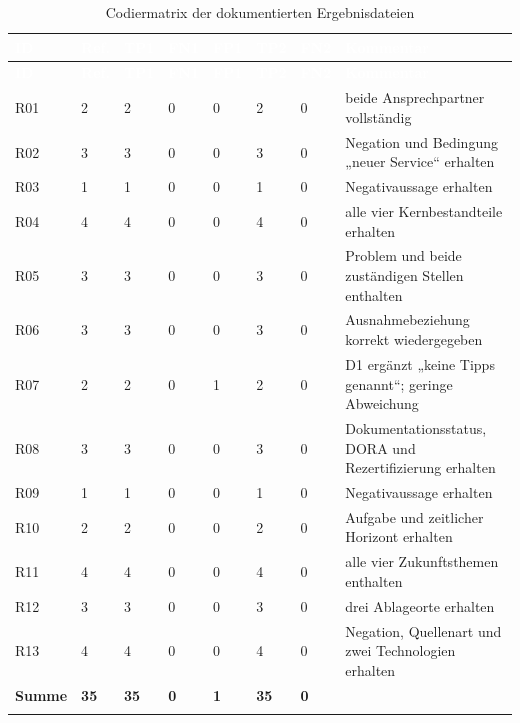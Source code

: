 \documentclass[
  10pt,
  ngerman,
  a4paper,
  toc=graduated,
  numbers=noenddot,
  headings=standardclasses
]{scrartcl}
\begin{document}
\scriptsize
\begin{longtable}{L{0.8cm}C{1.0cm}C{1.0cm}C{1.0cm}C{1.0cm}C{1.0cm}C{1.0cm}L{7.2cm}}
\toprule
{}
\textcolor{white}{\textbf{ID}} &
\textcolor{white}{\textbf{Ref.}} &
\textcolor{white}{\textbf{TP1}} &
\textcolor{white}{\textbf{FN1}} &
\textcolor{white}{\textbf{FP1}} &
\textcolor{white}{\textbf{TP2}} &
\textcolor{white}{\textbf{FN2}} &
\textcolor{white}{\textbf{Kommentar}}\\
\midrule
\endfirsthead
\toprule
{}
\textcolor{white}{\textbf{ID}} &
\textcolor{white}{\textbf{Ref.}} &
\textcolor{white}{\textbf{TP1}} &
\textcolor{white}{\textbf{FN1}} &
\textcolor{white}{\textbf{FP1}} &
\textcolor{white}{\textbf{TP2}} &
\textcolor{white}{\textbf{FN2}} &
\textcolor{white}{\textbf{Kommentar}}\\
\midrule
\endhead
R01 & 2 & 2 & 0 & 0 & 2 & 0 & beide Ansprechpartner vollständig\\
R02 & 3 & 3 & 0 & 0 & 3 & 0 & Negation und Bedingung „neuer Service“ erhalten\\
R03 & 1 & 1 & 0 & 0 & 1 & 0 & Negativaussage erhalten\\
R04 & 4 & 4 & 0 & 0 & 4 & 0 & alle vier Kernbestandteile erhalten\\
R05 & 3 & 3 & 0 & 0 & 3 & 0 & Problem und beide zuständigen Stellen enthalten\\
R06 & 3 & 3 & 0 & 0 & 3 & 0 & Ausnahmebeziehung korrekt wiedergegeben\\
R07 & 2 & 2 & 0 & 1 & 2 & 0 & D1 ergänzt „keine Tipps genannt“; geringe Abweichung\\
R08 & 3 & 3 & 0 & 0 & 3 & 0 & Dokumentationsstatus, DORA und Rezertifizierung erhalten\\
R09 & 1 & 1 & 0 & 0 & 1 & 0 & Negativaussage erhalten\\
R10 & 2 & 2 & 0 & 0 & 2 & 0 & Aufgabe und zeitlicher Horizont erhalten\\
R11 & 4 & 4 & 0 & 0 & 4 & 0 & alle vier Zukunftsthemen enthalten\\
R12 & 3 & 3 & 0 & 0 & 3 & 0 & drei Ablageorte erhalten\\
R13 & 4 & 4 & 0 & 0 & 4 & 0 & Negation, Quellenart und zwei Technologien erhalten\\
\midrule
\textbf{Summe} & \textbf{35} & \textbf{35} & \textbf{0} & \textbf{1} & \textbf{35} & \textbf{0} & \\
\bottomrule
\caption{Codiermatrix der dokumentierten Ergebnisdateien}
\label{tab:codiermatrix}
\end{longtable}
\normalsize
\end{document}
